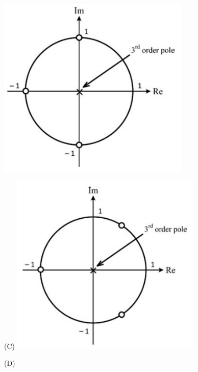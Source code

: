 \documentclass[a4paper, 11pt]{article}
\begin{document}
\begin{enumerate}
\begin{figure}[H]
\begin{minipage}{0.45\textwidth}
            \includegraphics[width=0.8\linewidth]{figs/Q14B.png}
            \label{fig:q24b}
        \end{minipage}
        \begin{minipage}{0.45\textwidth}
            \centering
            (C)
            \includegraphics[width=0.8\linewidth]{figs/Q14C.png}
            \label{fig:q24c}
        \end{minipage}
        \begin{minipage}{0.45\textwidth}
            \centering
            (D)

\end{minipage}
\end{figure}
\end{enumerate}
\end{document}
